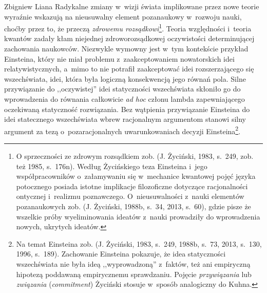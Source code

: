 \begin{artplenv}{Zbigniew Liana}
Radykalne zmiany w~wizji świata implikowane przez nowe teorie wyraźnie wskazują na nieusuwalny element pozanaukowy w~rozwoju
nauki, choćby przez to, że przeczą \textit{zdrowemu rozsądkowi}\footnote{O sprzeczności ze zdrowym rozsądkiem
zob. \label{ref:RND3LfNDVSWRv}(J. Życiński, 1983, s.~249, zob. też 1985, s.~176n). Według Życińskiego teza Einsteina i~jego
współpracowników o~załamywaniu się w~mechanice kwantowej pojęć języka potocznego posiada istotne implikacje
filozoficzne dotyczące racjonalności ontycznej i~realizmu poznawczego. O~nieusuwalności z~nauki elementów pozanaukowych
zob. \label{ref:RNDhn4h2RTiN2}(J. Życiński, 1988b, s.~34, 2013, s.~60), gdzie pisze że wszelkie próby wyeliminowania
ideatów z~nauki prowadziły do wprowadzenia nowych, ukrytych ideatów.}. Teoria względności i~teoria kwantów zadały kłam
niejednej zdroworozsądkowej oczywistości determinującej zachowania naukowców. Niezwykle wymowny jest w~tym kontekście 
przykład Einsteina, który nie miał problemu z~zaakceptowaniem nowatorskich idei relatywistycznych, a~mimo to nie
potrafił zaakceptować idei rozszerzającego się wszechświata, idei, która była logiczną konsekwencją jego równań pola.
Silne przywiązanie do ,,oczywistej'' idei statyczności wszechświata skłoniło go do wprowadzenia do równania całkowicie
\textit{ad hoc} członu lambda zapewniającego oczekiwaną statyczność rozwiązania. Bez wątpienia przywiązanie Einsteina do
idei statecznego wszechświata wbrew racjonalnym argumentom stanowi silny argument za tezą o~pozaracjonalnych
uwarunkowaniach decyzji Einsteina\footnote{Na temat Einsteina zob. \label{ref:RNDOEPytE2GkR}(J. Życiński, 1983, s.~249,
1988b, s.~73, 2013, s.~130, 1996, s.~189). Zachowanie Einsteina pokazuje, że idea statyczności wszechświata nie była
ideą ,,wyprowadzoną'' z~faktów, też ani empiryczną hipotezą poddawaną empirycznemu sprawdzaniu. Pojęcie
\textit{przywiązania} lub\textit{ związania }(\textit{commitment}) Życiński stosuje w~sposób analogiczny do Kuhna.}.


\end{artplenv}
